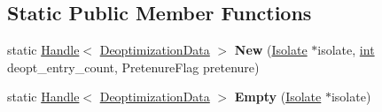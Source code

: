 \subsection*{Static Public Member Functions}
\begin{DoxyCompactItemize}
\item 
\mbox{\label{classv8_1_1internal_1_1DeoptimizationData_ae4bb5aa974b3d813ae54bbbb0b35879b}} 
static \mbox{\hyperlink{classv8_1_1internal_1_1Handle}{Handle}}$<$ \mbox{\hyperlink{classv8_1_1internal_1_1DeoptimizationData}{Deoptimization\+Data}} $>$ {\bfseries New} (\mbox{\hyperlink{classv8_1_1internal_1_1Isolate}{Isolate}} $\ast$isolate, \mbox{\hyperlink{classint}{int}} deopt\+\_\+entry\+\_\+count, Pretenure\+Flag pretenure)
\item 
\mbox{\label{classv8_1_1internal_1_1DeoptimizationData_ae5293da192afbe72a4f532a50ba76315}} 
static \mbox{\hyperlink{classv8_1_1internal_1_1Handle}{Handle}}$<$ \mbox{\hyperlink{classv8_1_1internal_1_1DeoptimizationData}{Deoptimization\+Data}} $>$ {\bfseries Empty} (\mbox{\hyperlink{classv8_1_1internal_1_1Isolate}{Isolate}} $\ast$isolate)
\end{DoxyCompactItemize}
